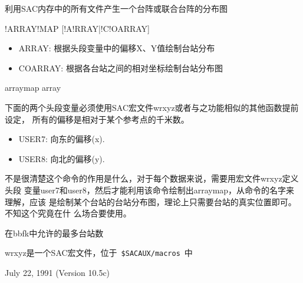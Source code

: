 \label{cmd:arraymap}

利用SAC内存中的所有文件产生一个台阵或联合台阵的分布图

\begin{SACSTX}
!ARRAY!MAP [!A!RRAY|!C!OARRAY]
\end{SACSTX}

\begin{itemize}
\item ARRAY: 根据头段变量中的偏移X、Y值绘制台站分布
\item COARRAY: 根据各台站之间的相对坐标绘制台站分布图
\end{itemize}

\begin{SACDFT}
arraymap array
\end{SACDFT}

下面的两个头段变量必须使用SAC宏文件wrxyz或者与之功能相似的其他函数提前设定，
所有的偏移是相对于某个参考点的千米数。
\begin{itemize}
\item USER7: 向东的偏移(x).
\item USER8: 向北的偏移(y).
\end{itemize}

不是很清楚这个命令的作用是什么，对于每个数据来说，需要用宏文件wrxyz定义头段
变量user7和user8，然后才能利用该命令绘制出arraymap，从命令的名字来理解，应该
是绘制某个台站的台站分布图，理论上只需要台站的真实位置即可。不知这个究竟在什
么场合要使用。

在bbfk中允许的最多台站数

wrxyz是一个SAC宏文件，位于~\lstinline{$SACAUX/macros}~中

July 22, 1991 (Version 10.5c)
